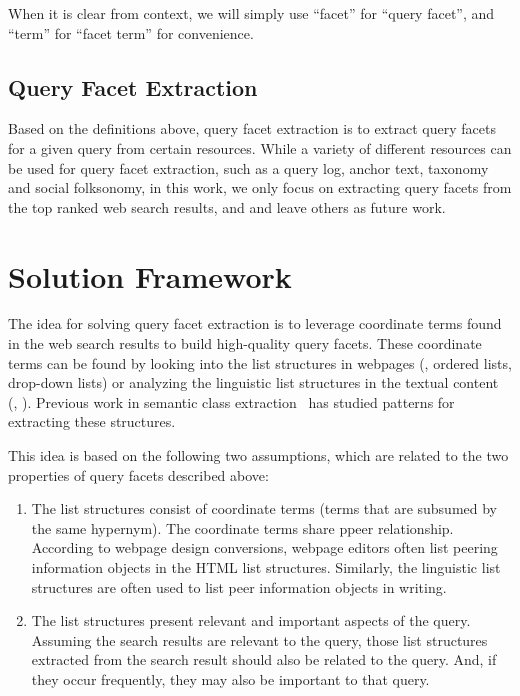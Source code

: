 When it is clear from context, we will simply use ``facet'' for ``query facet'', and ``term'' for ``facet term'' for convenience.

\subsection{Query Facet Extraction}
Based on the definitions above, query facet extraction is to extract query facets for a given query from certain resources. While a variety of different resources can be used for query facet extraction, such as a query log, anchor text, taxonomy and social folksonomy, in this work, we only focus on extracting query facets from the top ranked web search results, and and leave others as future work.

\section{Solution Framework}
\label{sec:facet-framework}
The idea for solving query facet extraction is to leverage coordinate terms found in the web search results to build high-quality query facets. These coordinate terms can be found by looking into the list structures in webpages (\eg, ordered lists, drop-down lists) or analyzing the linguistic list structures in the textual content (\eg, ).
Previous work in semantic class extraction~\cite{hearst1992automatic,pasca2004acquisition,kozareva2008semantic,shi2010corpus} has studied patterns for extracting these structures. 

This idea is based on the following two assumptions, which are related to the two properties of query facets described above:
\begin{enumerate}[label={(\arabic*)}]
 \item The list structures consist of coordinate terms (terms that are subsumed by the same hypernym). The coordinate terms share ppeer relationship. According to webpage design conversions, webpage editors often list peering information objects in the HTML list structures. Similarly, the linguistic list structures are often used to list peer information objects in writing.
 \item The list structures present relevant and important aspects of the query. Assuming the search results are relevant to the query, those list structures extracted from the search result should also be related to the query.  And, if they occur frequently, they may also be important to that query.
\end{enumerate}

